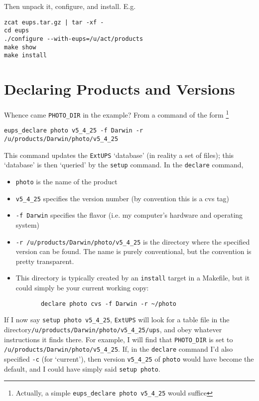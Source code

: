 \documentclass{article}
\newcommand{\code}[1]{\texttt{#1}}
\newcommand{\eups}{\code{ExtUPS}}
\begin{document}
Then unpack it, configure, and install.  E.g.
\begin{verbatim}
zcat eups.tar.gz | tar -xf -
cd eups
./configure --with-eups=/u/act/products
make show
make install
\end{verbatim}

\section{Declaring Products and Versions}

Whence came \code{PHOTO\_DIR} in the example? From a command of the form
\footnote{Actually, a simple \code{eups\_declare photo v5\_4\_25} would suffice}
\begin{verbatim}
eups_declare photo v5_4_25 -f Darwin -r /u/products/Darwin/photo/v5_4_25
\end{verbatim}

This command updates the \eups{} `database' (in reality a set of files);
this `database' is then `queried' by the \code{setup} command. In
the \code{declare} command,
\begin{itemize}
  \item
    \code{photo} is the name of the product

  \item
    \code{v5\_4\_25} specifies the version number (by convention this
    is a cvs tag)

  \item
    \code{-f Darwin} specifies the flavor (i.e. my computer's hardware and
    operating system)

  \item
    \code{-r /u/products/Darwin/photo/v5\_4\_25} is the directory where
    the specified version can be found. The name is purely conventional,
    but the convention is pretty transparent.

  \item
    This directory is typically created by an \code{install} target
    in a Makefile, but it could simply be your current working
    copy:
\begin{verbatim}
       declare photo cvs -f Darwin -r ~/photo
\end{verbatim}
\end{itemize}

If I now say \code{setup photo v5\_4\_25}, \eups{} will look for
a table file in the directory\hfil\break \code{/u/products/Darwin/photo/v5\_4\_25/ups},
and obey whatever instructions it finds there.  For example,
I will find that
\code{PHOTO\_DIR} is set to \code{/u/products/Darwin/photo/v5\_4\_25}. If,
in the \code{declare} command I'd also specified \code{-c} (for
`current'), then version \code{v5\_4\_25} of \code{photo} would
have become the default, and I could have simply said \code{setup photo}.
\end{document}
